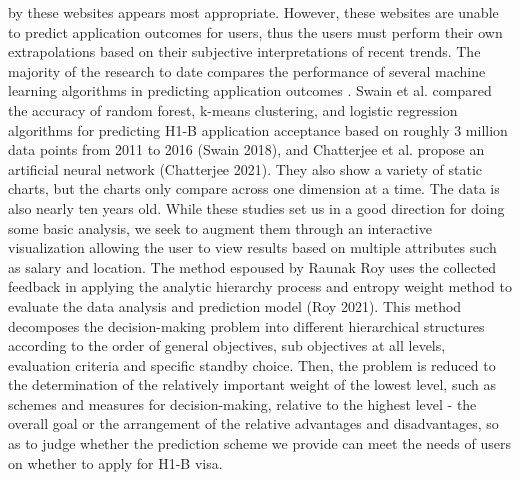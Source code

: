 \documentclass[sigconf]{acmart}
\begin{document}
by these websites appears most appropriate. However, these websites are unable to predict application outcomes for users, thus the 
users must perform their own extrapolations based on their subjective interpretations of recent trends.
The majority of the research to date compares the performance of several machine learning algorithms in predicting application outcomes . 
Swain et al. compared the accuracy of random forest, k-means clustering, and logistic regression algorithms for predicting 
H1-B application acceptance based on roughly 3 million data points from 2011 to 2016 (Swain 2018), and Chatterjee et al. propose an artificial 
neural network (Chatterjee 2021). They also show a variety of static charts, but the charts only compare across one dimension at a time. The data is 
also nearly ten years old. While these studies set us in a good direction for doing some basic analysis, we seek to augment them 
through an interactive visualization allowing the user to view results based on multiple attributes such as salary and location.
The method espoused by Raunak Roy uses the collected feedback in applying the analytic hierarchy process and entropy 
weight method to evaluate the data analysis and prediction model (Roy 2021). This method decomposes the decision-making problem into different 
hierarchical structures according to the order of general objectives, sub objectives at all levels, evaluation criteria and specific 
standby choice. Then, the problem is reduced to the determination of the relatively important weight of the lowest level, such as 
schemes and measures for decision-making, relative to the highest level - the overall goal or the arrangement of the relative 
advantages and disadvantages, so as to judge whether the prediction scheme we provide can meet the needs of users on whether to 
apply for H1-B visa.
\end{document}
